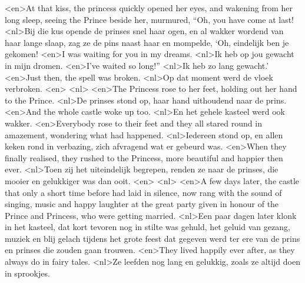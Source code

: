 <en>At that kiss, the princess quickly opened her eyes, and wakening from her long sleep, seeing the Prince beside her, murmured, “Oh, you have come at last!
<nl>Bij die kus opende de prinses snel haar ogen, en al wakker wordend van haar lange slaap, zag ze de pins naast haar en mompelde, `Oh, eindelijk ben je gekomen!
<en>I was waiting for you in my dreams.
<nl>Ik heb op jou gewacht in mijn dromen.
<en>I’ve waited so long!”
<nl>Ik heb zo lang gewacht.'
<en>Just then, the spell was broken.
<nl>Op dat moment werd de vloek verbroken.
<en>
<nl>
<en>The Princess rose to her feet, holding out her hand to the Prince.
<nl>De prinses stond op,  haar hand uithoudend naar de prins.
<en>And the whole castle woke up too.
<nl>En het gehele kasteel werd ook wakker.
<en>Everybody rose to their feet and they all stared round in amazement, wondering what had happened.
<nl>Iedereen stond op, en allen keken rond in verbazing, zich afvragend wat er gebeurd was. 
<en>When they finally realised, they rushed to the Princess, more beautiful and happier then ever.
<nl>Toen zij het uiteindelijk begrepen, renden ze naar de prinses, die mooier  en gelukkiger was dan ooit.
<en>
<nl>
<en>A few days later, the castle that only a short time before had laid in silence, now rang with the sound of singing, music and happy laughter at the great party given in honour of the Prince and Princess, who were getting married.
<nl>Een paar dagen later klonk in het kasteel, dat kort tevoren nog in stilte was gehuld, het geluid van gezang, muziek  en blij gelach tijdens het grote feest dat gegeven werd ter ere van de prins en prinses die zouden gaan trouwen.
<en>They lived happily ever after, as they always do in fairy tales.
<nl>Ze leefden nog lang en gelukkig, zoals ze altijd doen in sprookjes.
